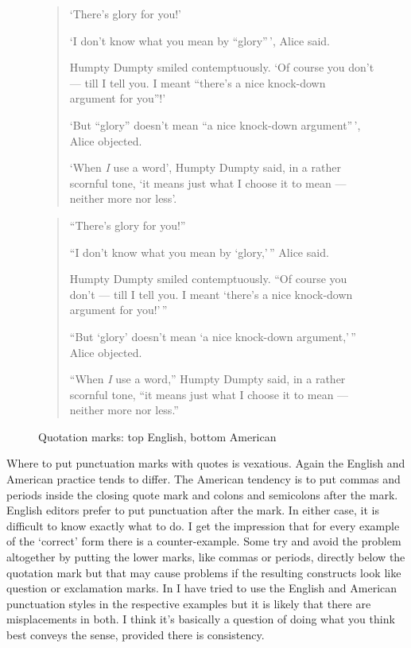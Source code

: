 \documentclass[10pt,a4paper,extrafontsizes]{memoir}
\begin{document}
\begin{figure}
\centering
\begin{minipage}{\textwidth}
\mbox{}\hrulefill\mbox{}
\begin{quotation}
    `There's glory for you!' 

    `I don't know what you mean by ``glory''\,', Alice said. 

    Humpty Dumpty smiled contemptuously. `Of course you don't --- till I tell
you. I meant ``there's a nice knock-down argument for you''!' 

    `But ``glory'' doesn't mean ``a nice knock-down argument''\,', Alice
objected. 

    `When \emph{I} use a word', Humpty Dumpty said, in a rather scornful
tone, `it means just what I choose it to mean --- neither more nor less'.
\end{quotation}
\mbox{}\hrulefill\mbox{}
\begin{quotation}
     ``There's glory for you!'' 

    ``I don't know what you mean by `glory,'\,'' Alice said. 

    Humpty Dumpty smiled contemptuously. ``Of course you don't --- till I tell
you. I meant `there's a nice knock-down argument for you!'\,'' 

    ``But `glory' doesn't mean `a nice knock-down argument,'\,'' Alice
objected. 

    ``When \emph{I} use a word,'' Humpty Dumpty said, in a rather scornful
tone, ``it means just what I choose it to mean --- neither more nor less.''
\end{quotation}
\mbox{}\hrulefill\mbox{}
\end{minipage}
\caption{Quotation marks: top English, bottom American}\label{fig:qmarks}
\end{figure}

\begin{paracol}{2}
\switchEng
    Where to put punctuation marks with quotes is vexatious. Again the
English and American practice tends to differ. The American tendency is
to put commas and periods inside the closing quote mark and colons and
semicolons after the mark. English editors prefer to put punctuation
after the mark.
In either case, it is difficult
to know exactly what to do. I get the impression that for every example
of the `correct' form there is a counter-example.
Some try and avoid the problem altogether by putting the lower marks, 
like commas or periods, 
directly below the quotation mark but that may cause problems if the 
resulting constructs look like question or exclamation marks. 
In  I have tried to use the English and American 
punctuation styles in the respective examples but it is likely that there
are misplacements in both. I think it's basically a question of doing what
you think best conveys the sense, provided there is consistency.
\end{paracol}
\end{document}
